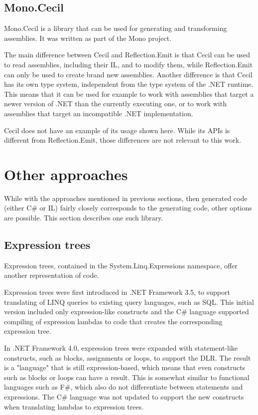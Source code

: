 \subsection{Mono.Cecil}
\label{cecil}

Mono.Cecil \cite{cecil} is a library that can be used for generating and transforming assemblies. It was written as part of the Mono project.

The main difference between Cecil and Reflection.Emit is that Cecil can be used to read assemblies, including their \ac{IL}, and to modify them, while Reflection.Emit can only be used to create brand new assemblies. Another difference is that Cecil has its own type system, independent from the type system of the .NET runtime. This means that it can be used for example to work with assemblies that target a newer version of .NET than the currently executing one, or to work with assemblies that target an incompatible .NET implementation.

\medskip

Cecil does not have an example of its usage shown here. While its \acp{API} is different from Reflection.Emit, those differences are not relevant to this work.

\section{Other approaches}

While with the approaches mentioned in previous sections, then generated code (either C\# or \ac{IL}) fairly closely corresponds to the generating code, other options are possible. This section describes one such library.

\subsection{Expression trees}
\label{expression-trees}

Expression trees, \cite{expression-trees} contained in the System.Linq.Expressions namespace, offer another representation of code.

Expression trees were first introduced in .NET Framework 3.5, to support translating of \ac{LINQ} queries to existing query languages, such as \ac{SQL}. This initial version included only expression-like constructs and the C\# language supported compiling of expression lambdas to code that creates the corresponding expression tree.

In .NET Framework 4.0, expression trees were expanded with statement-like constructs, such as blocks, assignments or loops, to support the \ac{DLR}. The result is a "language" that is still expression-based, which means that even constructs such as blocks or loops can have a result. This is somewhat similar to functional languages such as F\#, which also do not differentiate between statements and expressions. The C\# language was not updated to support the new constructs when translating lambdas to expression trees.

